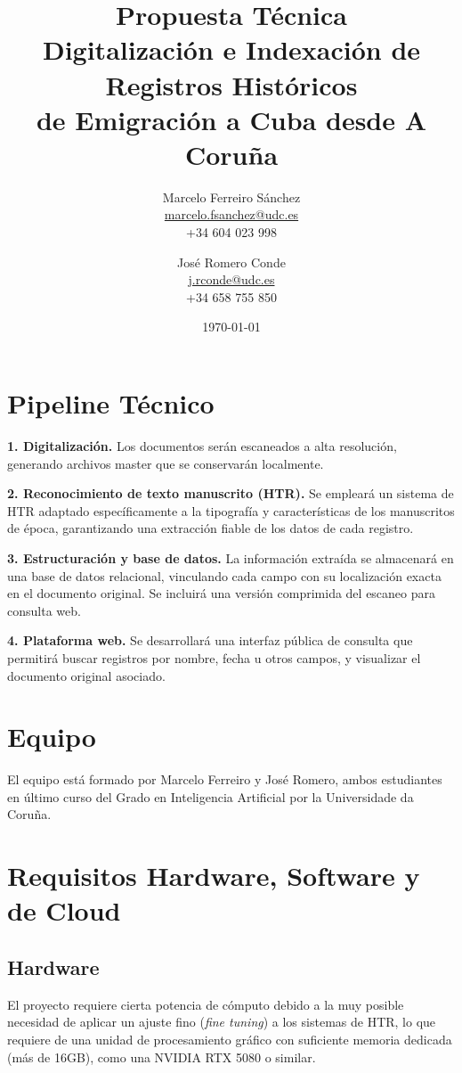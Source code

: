 \documentclass[11pt, a4paper]{article}
\title{
    \textbf{Propuesta Técnica} \\[0.3cm]
    \large Digitalización e Indexación de Registros Históricos\\
    de Emigración a Cuba desde A Coruña
}
\author{
    Marcelo Ferreiro Sánchez\\
    \small \href{mailto:marcelo.fsanchez@udc.es}{marcelo.fsanchez@udc.es} \\
    \small +34 604 023 998
    \and
    José Romero Conde\\
    \small \href{mailto:j.rconde@udc.es}{j.rconde@udc.es} \\
    \small +34 658 755 850
}
\date{\today}
\begin{document}
\maketitle


\section*{Pipeline Técnico}

\textbf{1. Digitalización.} Los documentos serán escaneados a alta resolución,
generando archivos master que se conservarán localmente.

\textbf{2. Reconocimiento de texto manuscrito (HTR).} Se empleará un sistema de
HTR adaptado específicamente a la tipografía y características de los
manuscritos de época, garantizando una extracción fiable de los datos de cada
registro. 

\textbf{3. Estructuración y base de datos.} La información extraída se
almacenará en una base de datos relacional, vinculando cada campo con su
localización exacta en el documento original. Se incluirá una versión comprimida
del escaneo para consulta web.

\textbf{4. Plataforma web.} Se desarrollará una interfaz pública de consulta que permitirá 
buscar registros por nombre, fecha u otros campos, y visualizar el documento original asociado.


\section*{Equipo}

El equipo está formado por Marcelo Ferreiro y José Romero, ambos estudiantes en
último curso del Grado en Inteligencia Artificial por la Universidade da Coruña.


\section*{Requisitos Hardware, Software y de Cloud}

\subsection*{Hardware}
El proyecto requiere cierta potencia de cómputo debido a la muy posible
necesidad de aplicar un ajuste fino (\textit{fine tuning}) a los sistemas de HTR,
lo que requiere de una unidad de procesamiento gráfico con suficiente memoria
dedicada (más de 16GB), como una NVIDIA RTX 5080 o similar. 
\end{document}
